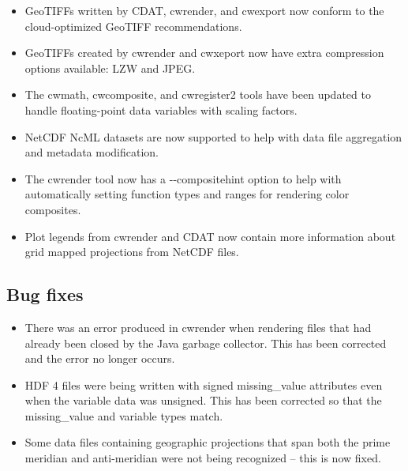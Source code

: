 \begin{itemize}
  
  \item GeoTIFFs written by CDAT, cwrender, and cwexport now conform to the
  cloud-optimized GeoTIFF recommendations.
  
  \item GeoTIFFs created by cwrender and cwxeport now have extra compression
  options available: LZW and JPEG.

  \item The cwmath, cwcomposite, and cwregister2 tools have been updated to
  handle floating-point data variables with scaling factors.

  \item NetCDF NcML datasets are now supported to help with data file
  aggregation and metadata modification.

  \item The cwrender tool now has a -{-}compositehint option to help with
  automatically setting function types and ranges for rendering color composites.
  
  \item Plot legends from cwrender and CDAT now contain more information
  about grid mapped projections from NetCDF files.
  
\end{itemize}

\subsection*{ Bug fixes}
\begin{itemize}

  \item There was an error produced in cwrender when rendering files that had
  already been closed by the Java garbage collector.  This has been corrected
  and the error no longer occurs.

  \item HDF 4 files were being written with signed missing\_value attributes
  even when the variable data was unsigned.  This has been corrected so that
  the missing\_value and variable types match.

  \item Some data files containing geographic projections that span both the
  prime meridian and anti-meridian were not being recognized -- this is now
  fixed.
  
\end{itemize}

